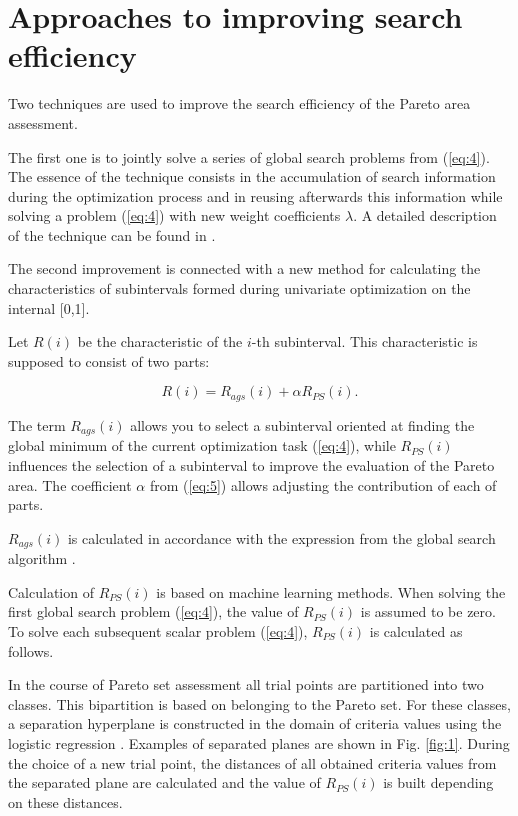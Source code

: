 \documentclass[runningheads]{llncs}
\begin{document}
\section{Approaches to improving search efficiency}

Two techniques are used to improve the search efficiency of the Pareto area assessment. 

The first one is to jointly solve a series of global search problems from (\ref{eq:4}). The essence of the technique consists in the accumulation of search information during the optimization process and in reusing afterwards this information while solving a problem (\ref{eq:4}) with new weight coefficients $\lambda$. A detailed description of the technique can be found in \cite{GergelKozinovAPI2016,Gergel2018}.

The second improvement is connected with a new method for calculating the characteristics of subintervals formed during univariate optimization on the internal [0,1].

Let $R(i)$ be the characteristic of the $i$-th subinterval. This characteristic is supposed to consist of two parts:

\begin{equation}
R(i)=R_{ags} (i)+ \alpha R_{PS} (i).
\label{eq:5}
\end{equation}

The term $R_{ags}(i)$ allows you to select a subinterval oriented at finding the global minimum of the current optimization task (\ref{eq:4}), while $R_{PS}(i)$ influences the selection of a subinterval to improve the evaluation of the Pareto area. The coefficient $\alpha$ from (\ref{eq:5}) allows adjusting the contribution of each of parts.

$R_{ags}(i)$ is calculated in accordance with the expression from the global search algorithm \cite{GergelKozinovAPI2016,Gergel2018,Sergeyev2013,Strongin2000}.

Calculation of $R_{PS}(i)$ is based on machine learning methods. When solving the first global search problem (\ref{eq:4}), the value of $R_{PS}(i)$ is assumed to be zero. To solve each subsequent scalar problem (\ref{eq:4}), $R_{PS}(i)$ is calculated as follows.

In the course of Pareto set assessment all trial points are partitioned into two classes. This bipartition is based on belonging to the Pareto set. For these classes, a separation hyperplane is constructed in the domain of criteria values using the logistic regression \cite{Yu2011}. Examples of separated planes are shown in Fig. \ref{fig:1}. During the choice of a new trial point, the distances of all obtained criteria values from the separated plane are calculated and the value of $R_{PS}(i)$ is built depending on these distances. 
\end{document}
